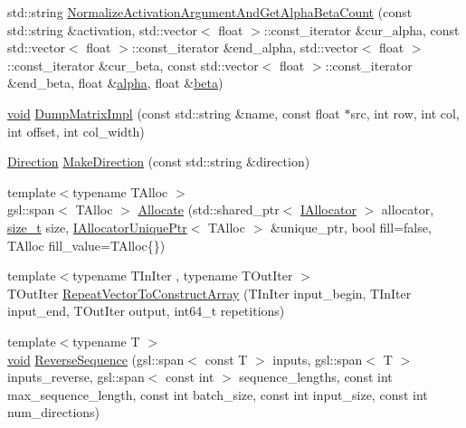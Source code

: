 \begin{DoxyCompactItemize}
\item 
std\+::string \mbox{\hyperlink{namespaceonnxruntime_1_1rnn_1_1detail_a7430ba18a1d92a16537bcb4906c29504}{Normalize\+Activation\+Argument\+And\+Get\+Alpha\+Beta\+Count}} (const std\+::string \&activation, std\+::vector$<$ float $>$\+::const\+\_\+iterator \&cur\+\_\+alpha, const std\+::vector$<$ float $>$\+::const\+\_\+iterator \&end\+\_\+alpha, std\+::vector$<$ float $>$\+::const\+\_\+iterator \&cur\+\_\+beta, const std\+::vector$<$ float $>$\+::const\+\_\+iterator \&end\+\_\+beta, float \&\mbox{\hyperlink{mlasi_8h_a1763355f32e1812e5cb3a0080e7cca12}{alpha}}, float \&\mbox{\hyperlink{mlasi_8h_a5fd37d216981b4cd9a19e29b5acd48d4}{beta}})
\item 
\mbox{\hyperlink{mlasi_8h_a88f941d423cb2a819b70a1358982b1a6}{void}} \mbox{\hyperlink{namespaceonnxruntime_1_1rnn_1_1detail_adb3b48ba8d1bafa2344de37a71e96690}{Dump\+Matrix\+Impl}} (const std\+::string \&name, const float $\ast$src, int row, int col, int offset, int col\+\_\+width)
\item 
\mbox{\hyperlink{namespaceonnxruntime_1_1rnn_1_1detail_a3a4cfb298df0a68436cdb8879647de1d}{Direction}} \mbox{\hyperlink{namespaceonnxruntime_1_1rnn_1_1detail_aeabc0c0d70045235942f55de6ea98aa1}{Make\+Direction}} (const std\+::string \&direction)
\item 
{\footnotesize template$<$typename T\+Alloc $>$ }\\gsl\+::span$<$ T\+Alloc $>$ \mbox{\hyperlink{namespaceonnxruntime_1_1rnn_1_1detail_aba3626475ee331edec1c2ac149af1692}{Allocate}} (std\+::shared\+\_\+ptr$<$ \mbox{\hyperlink{classonnxruntime_1_1IAllocator}{I\+Allocator}} $>$ allocator, \mbox{\hyperlink{mlasi_8h_a503efbc1c6e50825320ad909366b78ab}{size\+\_\+t}} size, \mbox{\hyperlink{namespaceonnxruntime_a323aace024f171700e4b07b299a178e7}{I\+Allocator\+Unique\+Ptr}}$<$ T\+Alloc $>$ \&unique\+\_\+ptr, bool fill=false, T\+Alloc fill\+\_\+value=T\+Alloc\{\})
\item 
{\footnotesize template$<$typename T\+In\+Iter , typename T\+Out\+Iter $>$ }\\T\+Out\+Iter \mbox{\hyperlink{namespaceonnxruntime_1_1rnn_1_1detail_a08091b2e867821d9f8b8260c43c7840e}{Repeat\+Vector\+To\+Construct\+Array}} (T\+In\+Iter input\+\_\+begin, T\+In\+Iter input\+\_\+end, T\+Out\+Iter output, int64\+\_\+t repetitions)
\item 
{\footnotesize template$<$typename T $>$ }\\\mbox{\hyperlink{mlasi_8h_a88f941d423cb2a819b70a1358982b1a6}{void}} \mbox{\hyperlink{namespaceonnxruntime_1_1rnn_1_1detail_a6949fdd6fb359403f29a7cc9594cfdab}{Reverse\+Sequence}} (gsl\+::span$<$ const T $>$ inputs, gsl\+::span$<$ T $>$ inputs\+\_\+reverse, gsl\+::span$<$ const int $>$ sequence\+\_\+lengths, const int max\+\_\+sequence\+\_\+length, const int batch\+\_\+size, const int input\+\_\+size, const int num\+\_\+directions)

\end{DoxyCompactItemize}
